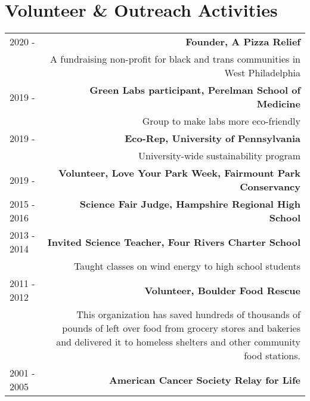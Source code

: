 \section*{Volunteer \& Outreach Activities}
\begin{tabular}{L!{\VRule}R}
    2020 -& \textbf{Founder, A Pizza Relief} \\ 
    & A fundraising non-profit for black and trans communities in West Philadelphia\\ 
    2019 -& \textbf{Green Labs participant, Perelman School of Medicine}\\
        & Group to make labs more eco-friendly \\
    2019 - & \textbf{Eco-Rep, University of Pennsylvania}\\
        & University-wide sustainability program \\
    2019 - & \textbf{Volunteer, Love Your Park Week, Fairmount Park Conservancy}\\
    2015 - 2016& \textbf{Science Fair Judge, Hampshire Regional High School} \\
    2013 - 2014& \textbf{Invited Science Teacher, Four Rivers Charter School}\\
                & Taught classes on wind energy to high school students\\
    2011 - 2012& \textbf{Volunteer, Boulder Food Rescue}\\
& This organization has saved hundreds of thousands of pounds of left over food from grocery stores and bakeries and delivered it to homeless shelters and other community food stations. \\
    2001 - 2005& \textbf{American Cancer Society Relay for Life}\\
\end{tabular}
